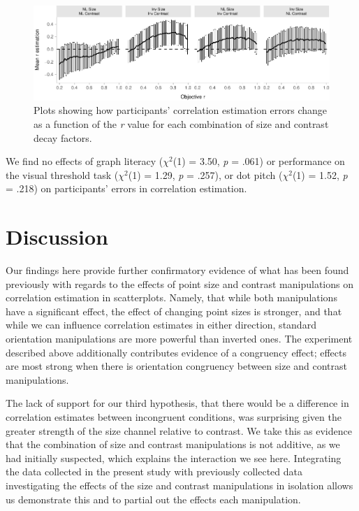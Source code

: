\documentclass[manuscript, review, anonymous, screen]{acmart}
\begin{document}
\begin{figure}

{\centering \includegraphics[width=1\textwidth,height=\textheight]{size_and_contrast_new_files/figure-pdf/fig-diff-error-bars-plot-1.pdf}

}

\caption{\label{fig-diff-error-bars-plot}Plots showing how participants'
correlation estimation errors change as a function of the \emph{r} value
for each combination of size and contrast decay factors.}

\end{figure}

We find no effects of graph literacy (\(\chi^2\)(1) = 3.50, \emph{p} =
.061) or performance on the visual threshold task (\(\chi^2\)(1) = 1.29,
\emph{p} = .257), or dot pitch (\(\chi^2\)(1) = 1.52, \emph{p} = .218)
on participants' errors in correlation estimation.

\hypertarget{sec-discussion}{%
\section{Discussion}\label{sec-discussion}}

Our findings here provide further confirmatory evidence of what has been
found previously with regards to the effects of point size and contrast
manipulations on correlation estimation in scatterplots. Namely, that
while both manipulations have a significant effect, the effect of
changing point sizes is stronger, and that while we can influence
correlation estimates in either direction, standard orientation
manipulations are more powerful than inverted ones. The experiment
described above additionally contributes evidence of a congruency
effect; effects are most strong when there is orientation congruency
between size and contrast manipulations.

The lack of support for our third hypothesis, that there would be a
difference in correlation estimates between incongruent conditions, was
surprising given the greater strength of the size channel relative to
contrast. We take this as evidence that the combination of size and
contrast manipulations is not additive, as we had initially suspected,
which explains the interaction we see here. Integrating the data
collected in the present study with previously collected data
investigating the effects of the size and contrast manipulations in
isolation allows us demonstrate this and to partial out the effects each
manipulation.
\end{document}
